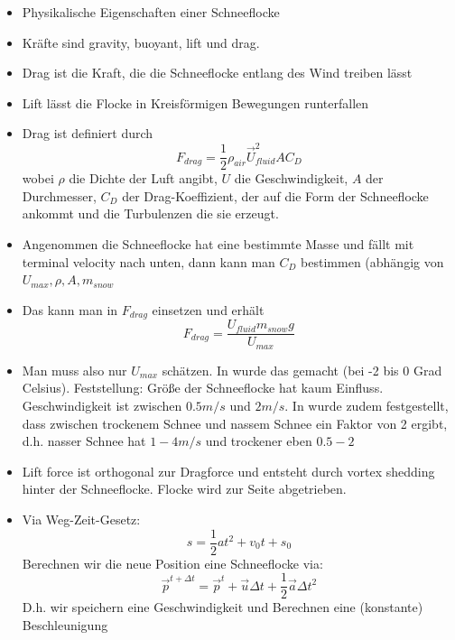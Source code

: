 \begin{itemize}
\item Physikalische Eigenschaften einer Schneeflocke
\item Kräfte sind gravity, buoyant, lift und drag.
\item Drag ist die Kraft, die die Schneeflocke entlang des Wind treiben lässt
\item Lift lässt die Flocke in Kreisförmigen Bewegungen runterfallen
\item Drag ist definiert durch
\[
F_{drag} = \frac{1}{2} \rho_{air} \vec{U}_{fluid}^2 A C_D
\]
wobei $\rho$ die Dichte der Luft angibt, $U$ die
Geschwindigkeit, $A$ der Durchmesser, $C_D$ der Drag-Koeffizient, der auf die
Form der Schneeflocke ankommt und die Turbulenzen die sie erzeugt.
\item Angenommen die Schneeflocke hat eine bestimmte Masse und fällt mit
terminal velocity nach unten, dann kann man $C_D$ bestimmen (abhängig von $U_{max}, \rho, A, m_{snow}$
\item Das kann man in $F_{drag}$ einsetzen und erhält
\[
F_{drag} = \frac{U_{fluid} m_{snow} g}{U_{max}}
\]
\item Man muss also nur $U_{max}$ schätzen. In \cite{Hanesch1966} wurde das
gemacht (bei -2 bis 0 Grad Celsius). Feststellung: Größe der Schneeflocke hat
kaum Einfluss. Geschwindigkeit ist zwischen $0.5m/s$ und $2m/s$. In
\cite{Canada1999} wurde zudem festgestellt, dass zwischen trockenem Schnee und
nassem Schnee ein Faktor von 2 ergibt, d.h. nasser Schnee hat $1-4m/s$ und
trockener eben $0.5-2$
\item Lift force ist orthogonal zur Dragforce und entsteht durch vortex shedding
hinter der Schneeflocke. Flocke wird zur Seite abgetrieben.
\item Via Weg-Zeit-Gesetz:
\[
s=\frac{1}{2}at^2 + v_0 t + s_0
\]
Berechnen wir die neue Position eine Schneeflocke via:
\[
\vec{p}^{t+\Delta t} = \vec{p}^t + \vec{u} \Delta t + \frac{1}{2} \vec{a} \Delta t^2
\]
D.h. wir speichern eine Geschwindigkeit und Berechnen eine (konstante) Beschleunigung


\end{itemize}
